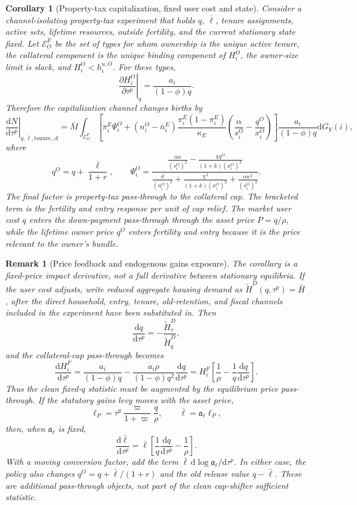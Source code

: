 \documentclass[11pt]{article}
\newtheorem{corollary}{Corollary}
\newtheorem{remark}{Remark}
\newcommand{\dd}{\mathrm d}
\newcommand{\1}{\mathbf 1}
\begin{document}
\begin{corollary}[Property-tax capitalization, fixed user cost and state]
\label{cor:property_tax_capitalization_ss}
Consider a channel-isolating property-tax experiment that holds $q$, $\bar\ell$, tenure assignments, active sets, lifetime resources, outside fertility, and the current stationary state fixed. Let $\mathcal E_O^F$ be the set of types for whom ownership is the unique active tenure, the collateral component is the unique binding component of $H_i^O$, the owner-size limit is slack, and $H_i^O<h_i^{u,O}$. For these types,
\[
\left.\frac{\partial H_i^O}{\partial \tau^p}\right|_q
=
\frac{a_i}{(1-\phi)q}.
\]
Therefore the capitalization channel changes births by
\[
\left.\frac{\dd N}{\dd \tau^p}\right|_{q,\bar\ell,\mathrm{tenure},\mathcal A}
=
\bar M
\int_{\mathcal E_O^F}
\left[
\pi_i^E\Psi_i^O
+
(n_i^O-\bar n_i^E)
\frac{\pi_i^E(1-\pi_i^E)}{\kappa_E}
\left(
\frac{\alpha}{s_i^O}-\frac{q^O}{x_i^O}
\right)
\right]
\frac{a_i}{(1-\phi)q}
\dd G_Y(i),
\]
where
\[
q^O=q+\frac{\bar\ell}{1+r},
\qquad
\Psi_i^O
=
\frac{
\frac{\alpha\kappa}{(s_i^O)^2}
-
\frac{\chi q^O}{(1+k)(x_i^O)^2}
}{
\frac{\vartheta}{(n_i^O)^2}
+
\frac{\chi^2}{(1+k)(x_i^O)^2}
+
\frac{\alpha\kappa^2}{(s_i^O)^2}
}.
\]
The final factor is property-tax pass-through to the collateral cap. The bracketed term is the fertility and entry response per unit of cap relief. The market user cost $q$ enters the down-payment pass-through through the asset price $P=q/\rho$, while the lifetime owner price $q^O$ enters fertility and entry because it is the price relevant to the owner's bundle.
\end{corollary}

\begin{remark}[Price feedback and endogenous gains exposure]
The corollary is a fixed-price impact derivative, not a full derivative between stationary equilibria. If the user cost adjusts, write reduced aggregate housing demand as $\widetilde H^D(q,\tau^p)=\bar H$, after the direct household, entry, tenure, old-retention, and fiscal channels included in the experiment have been substituted in. Then
\[
\frac{\dd q}{\dd\tau^p}
=
-\frac{\widetilde H_\tau^D}{\widetilde H_q^D},
\]
and the collateral-cap pass-through becomes
\[
\frac{\dd H_i^F}{\dd\tau^p}
=
\frac{a_i}{(1-\phi)q}
-
\frac{a_i\rho}{(1-\phi)q^2}\frac{\dd q}{\dd\tau^p}
=
H_i^F
\left[
\frac{1}{\rho}
-
\frac{1}{q}\frac{\dd q}{\dd\tau^p}
\right].
\]
Thus the clean fixed-$q$ statistic must be augmented by the equilibrium price pass-through. If the statutory gains levy moves with the asset price,
\[
\ell_P=\tau^g\frac{\varpi}{1+\varpi}\frac{q}{\rho},
\qquad
\bar\ell=\mathfrak a_\ell \ell_P,
\]
then, when $\mathfrak a_\ell$ is fixed,
\[
\frac{\dd\bar\ell}{\dd\tau^p}
=
\bar\ell
\left[
\frac{1}{q}\frac{\dd q}{\dd\tau^p}
-
\frac{1}{\rho}
\right].
\]
With a moving conversion factor, add the term $\bar\ell\,\dd\log\mathfrak a_\ell/\dd\tau^p$. In either case, the policy also changes $q^O=q+\bar\ell/(1+r)$ and the old release value $q-\bar\ell$. These are additional pass-through objects, not part of the clean cap-shifter sufficient statistic.
\end{remark}
\end{document}
